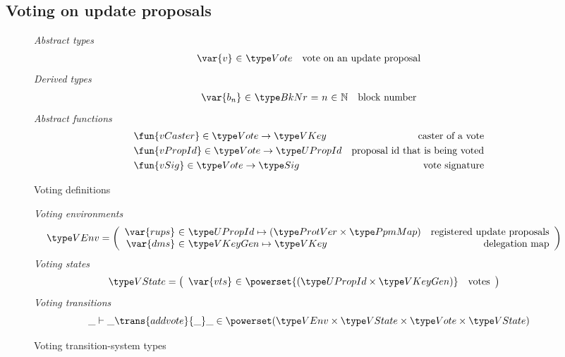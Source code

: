 \clearpage

\subsection{Voting on update proposals}
\label{sec:voting-on-update-proposals}

\begin{figure}[htb]
  \emph{Abstract types}
  \begin{equation*}
    \begin{array}{r@{~\in~}lr}
      \var{v} & \Vote & \text{vote on an update proposal}
    \end{array}
  \end{equation*}
  \emph{Derived types}
  \begin{equation*}
    \begin{array}{r@{~\in~}l@{~=~}r@{~\in~}lr}
      \var{b_n} & \BkNr & n & \mathbb{N} & \text{block number}
    \end{array}
  \end{equation*}
  \emph{Abstract functions}
  \begin{align*}
    & \fun{vCaster} \in \Vote \to \VKey & \text{caster of a vote}\\
    & \fun{vPropId} \in \Vote \to \UPropId & \text{proposal id that is being voted}\\
    & \fun{vSig} \in \Vote \to \Sig & \text{vote signature}
  \end{align*}
  \caption{Voting definitions}
  \label{fig:defs:voting}
\end{figure}

\begin{figure}[htb]
  \emph{Voting environments}
  \begin{align*}
    & \VEnv
      = \left(
      \begin{array}{r@{~\in~}lr}
        \var{rups} & \UPropId \mapsto (\ProtVer \times \PPMMap)
        & \text{registered update proposals}\\
        \var{dms} & \VKeyGen \mapsto \VKey & \text{delegation map}
      \end{array}\right)
  \end{align*}
  \emph{Voting states}
  \begin{align*}
    & \VState
      = \left(
      \begin{array}{r@{~\in~}lr}
        \var{vts} & \powerset{(\UPropId \times \VKeyGen)} & \text{votes}
      \end{array}\right)
  \end{align*}
  \emph{Voting transitions}
    \begin{equation*}
    \_ \vdash \_ \trans{addvote}{\_} \_ \in
    \powerset (\VEnv \times \VState \times \Vote \times \VState)
    \end{equation*}
  \caption{Voting transition-system types}
  \label{fig:ts-types:voting}
\end{figure}

